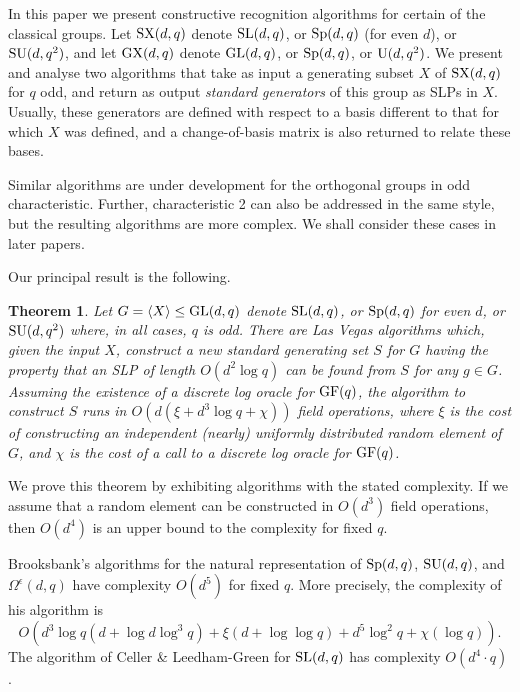 \documentclass[12pt]{article}
\newtheorem{theorem}[definition]{Theorem}
\def\SL{{\rm SL}}
\def\GL{{\rm GL}}
\def\U{{\rm U}}
\def\GF{{\rm GF}}
\def\Sp{{\rm Sp}}
\def\SU{{\rm SU}}
\def\SX{{\rm SX}}
\def\GX{{\rm GX}}
\begin{document}
In this paper we present constructive
recognition algorithms for certain of the classical groups.
Let $\SX(d,q)$ denote $\SL(d,q)$, or $\Sp(d,q)$ (for 
even $d$), or $\SU(d,q^2)$, and let $\GX(d,q)$ denote
$\GL(d,q)$, or $\Sp(d,q)$, or $\U(d,q^2)$. 
We present and analyse two algorithms that
take as input a generating subset $X$ of $\SX(d,q)$ for $q$ odd, and
return as output {\it standard generators} of this group as 
SLPs in $X$. Usually, these  
generators are defined with respect to a 
basis different to that for which $X$ was defined, 
and a change-of-basis 
matrix is also returned to relate these bases.

Similar algorithms are under development for the orthogonal groups
in odd characteristic.  Further, characteristic 2 can also be 
addressed in the same style, but the resulting algorithms are more complex.
We shall consider these cases in later papers.

Our principal result is the following.
\begin{theorem} \label{main}
Let $G = \langle X \rangle \leq \GL(d, q)$ denote 
$\SL(d,q)$, or $\Sp(d,q)$ for even $d$, or $\SU(d,q^2)$
where, in all cases, $q$ is odd. 
There are Las Vegas algorithms which,
given the input $X$, 
construct a new standard generating set $S$ 
for $G$ having the property that 
an SLP of length $O(d^2 \log q)$
can be found from $S$ for any $g \in G$. 
Assuming the existence of a discrete log oracle 
for $\GF (q)$, 
the algorithm to construct
$S$ runs in $O(d (\xi + d^3 \log q + \chi))$ field operations, 
where $\xi$ is the cost of constructing an independent 
(nearly) uniformly distributed random element of $G$,
and $\chi$ is the cost of a call to a discrete log oracle for $\GF(q)$.
\end{theorem}

We prove this theorem by exhibiting algorithms
with the stated complexity. If we assume that
a random element can be constructed in 
$O(d^3)$ field operations, then $O(d^4)$ is 
an upper bound to the complexity for fixed $q$. 

Brooksbank's algorithms \cite{Brooksbank03} 
for the natural 
representation of $\Sp(d, q)$, $\SU(d, q)$, and $\Omega^\epsilon(d, q)$ 
have complexity $O(d^5)$ for fixed $q$. More precisely, 
the complexity of his algorithm is 
$$O(d^3 \log q (d + \log d \log^3 q) + \xi(d + \log \log q) + d^5 \log^2 q
   + \chi(\log q)).$$
The algorithm of Celler \& Leedham-Green \cite{CellerLeedhamGreen98}
for $\SL(d, q)$ has complexity $O(d^4 \cdot q)$.
\end{document}

